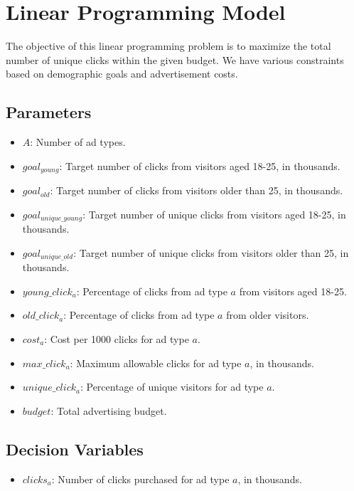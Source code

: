 \documentclass{article}
\begin{document}
\section*{Linear Programming Model}

The objective of this linear programming problem is to maximize the total number of unique clicks within the given budget. We have various constraints based on demographic goals and advertisement costs.

\subsection*{Parameters}

\begin{itemize}
    \item $A$: Number of ad types.
    \item $goal_{young}$: Target number of clicks from visitors aged 18-25, in thousands.
    \item $goal_{old}$: Target number of clicks from visitors older than 25, in thousands.
    \item $goal_{unique\_young}$: Target number of unique clicks from visitors aged 18-25, in thousands.
    \item $goal_{unique\_old}$: Target number of unique clicks from visitors older than 25, in thousands.
    \item $young\_click_{a}$: Percentage of clicks from ad type $a$ from visitors aged 18-25.
    \item $old\_click_{a}$: Percentage of clicks from ad type $a$ from older visitors.
    \item $cost_{a}$: Cost per 1000 clicks for ad type $a$.
    \item $max\_click_{a}$: Maximum allowable clicks for ad type $a$, in thousands.
    \item $unique\_click_{a}$: Percentage of unique visitors for ad type $a$.
    \item $budget$: Total advertising budget.
\end{itemize}

\subsection*{Decision Variables}

\begin{itemize}
    \item $clicks_{a}$: Number of clicks purchased for ad type $a$, in thousands.
\end{itemize}
\end{document}

